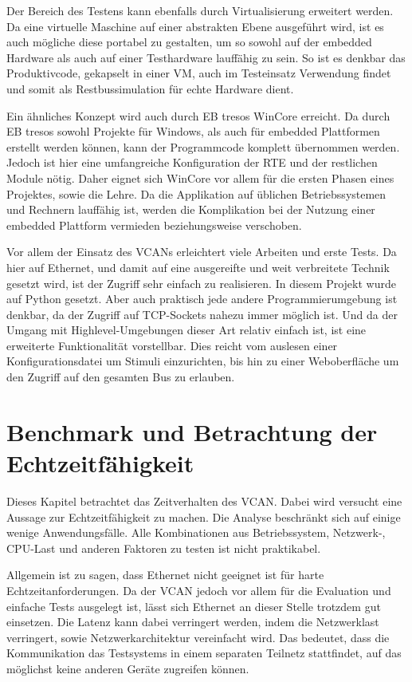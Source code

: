 \documentclass[
  a4paper,					    %
  twoside,
  DIV=calc,     				%
  bibliography=totoc,
  cleardoublepage=empty,
  ngerman,     					%
  final       					%
]{scrbook}
\begin{document}
Der Bereich des Testens kann ebenfalls durch Virtualisierung erweitert werden. Da eine virtuelle Maschine auf einer abstrakten Ebene ausgeführt wird, ist es auch mögliche diese portabel zu gestalten, um so sowohl auf der embedded Hardware als auch auf einer Testhardware lauffähig zu sein. So ist es denkbar das Produktivcode, gekapselt in einer VM, auch im Testeinsatz Verwendung findet und somit als Restbussimulation für echte Hardware dient.

Ein ähnliches Konzept wird auch durch EB tresos WinCore erreicht. Da durch EB tresos sowohl Projekte für Windows, als auch für embedded Plattformen erstellt werden können, kann der Programmcode komplett übernommen werden. Jedoch ist hier eine umfangreiche Konfiguration der RTE und der restlichen Module nötig. Daher eignet sich WinCore vor allem für die ersten Phasen eines Projektes, sowie die Lehre. Da die Applikation auf üblichen Betriebssystemen und Rechnern lauffähig ist, werden die Komplikation bei der Nutzung einer embedded Plattform vermieden beziehungsweise verschoben.

Vor allem der Einsatz des VCANs erleichtert viele Arbeiten und erste Tests. Da hier auf Ethernet, und damit auf eine ausgereifte und weit verbreitete Technik gesetzt wird, ist der Zugriff sehr einfach zu realisieren. In diesem Projekt wurde auf Python gesetzt. Aber auch praktisch jede andere Programmierumgebung ist denkbar, da der Zugriff auf TCP-Sockets nahezu immer möglich ist. Und da der Umgang mit Highlevel-Umgebungen dieser Art relativ einfach ist, ist eine erweiterte Funktionalität vorstellbar. Dies reicht vom auslesen einer Konfigurationsdatei um Stimuli einzurichten, bis hin zu einer Weboberfläche um den Zugriff auf den gesamten Bus zu erlauben.



% 
\section{Benchmark und Betrachtung der Echtzeitfähigkeit}
\label{sec:Benchmark}
Dieses Kapitel betrachtet das Zeitverhalten des VCAN. Dabei wird versucht eine Aussage zur Echtzeitfähigkeit zu machen. Die Analyse beschränkt sich auf einige wenige Anwendungsfälle. Alle Kombinationen aus Betriebssystem, Netzwerk-, CPU-Last und anderen Faktoren zu testen ist nicht praktikabel.

Allgemein ist zu sagen, dass Ethernet nicht geeignet ist für harte Echtzeitanforderungen. Da der VCAN jedoch vor allem für die Evaluation und einfache Tests ausgelegt ist, lässt sich Ethernet an dieser Stelle trotzdem gut einsetzen. Die Latenz kann dabei verringert werden, indem die Netzwerklast verringert, sowie Netzwerkarchitektur vereinfacht wird. Das bedeutet, dass die Kommunikation das Testsystems in einem separaten Teilnetz stattfindet, auf das möglichst keine anderen Geräte zugreifen können. 
\end{document}
